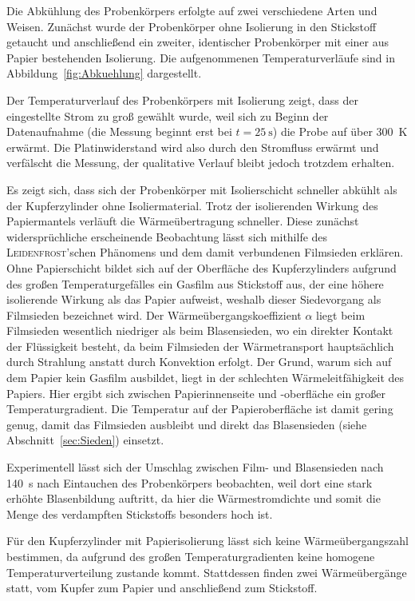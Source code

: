 \documentclass[parskip=half, a4paper,twoside,final]{article}
\begin{document}
Die Abkühlung des Probenkörpers erfolgte auf zwei verschiedene Arten und Weisen. Zunächst wurde der Probenkörper ohne Isolierung in den Stickstoff getaucht und anschließend ein zweiter, identischer Probenkörper mit einer aus Papier bestehenden Isolierung. Die aufgenommenen Temperaturverläufe sind in Abbildung~\ref{fig:Abkuehlung} dargestellt.



Der Temperaturverlauf des Probenkörpers mit Isolierung zeigt, dass der eingestellte Strom zu groß gewählt wurde, weil sich zu Beginn der Datenaufnahme (die Messung beginnt erst bei $t= \SI{25}{\second}$) die Probe auf über \SI{300}{\kelvin} erwärmt. Die Platinwiderstand wird also durch den Stromfluss erwärmt und verfälscht die Messung, der qualitative Verlauf bleibt jedoch trotzdem erhalten.

Es zeigt sich, dass sich der Probenkörper mit Isolierschicht schneller abkühlt als der Kupferzylinder ohne Isoliermaterial. Trotz der isolierenden Wirkung des Papiermantels verläuft die Wärmeübertragung schneller. Diese zunächst widersprüchliche erscheinende Beobachtung lässt sich mithilfe des \textsc{Leidenfrost}'schen Phänomens und dem damit verbundenen Filmsieden erklären. Ohne Papierschicht bildet sich auf der Oberfläche des Kupferzylinders aufgrund des großen Temperaturgefälles ein Gasfilm aus Stickstoff aus, der eine höhere isolierende Wirkung als das Papier aufweist, weshalb dieser Siedevorgang als Filmsieden bezeichnet wird. Der Wärmeübergangskoeffizient $\alpha$ liegt beim Filmsieden wesentlich niedriger als beim Blasensieden, wo ein direkter Kontakt der Flüssigkeit besteht, da beim Filmsieden der Wärmetransport hauptsächlich durch Strahlung anstatt durch Konvektion erfolgt. Der Grund, warum sich auf dem Papier kein Gasfilm ausbildet, liegt in der schlechten Wärmeleitfähigkeit des Papiers. Hier ergibt sich zwischen Papierinnenseite und -oberfläche ein großer Temperaturgradient. Die Temperatur auf der Papieroberfläche ist damit gering genug, damit das Filmsieden ausbleibt und direkt das Blasensieden (siehe Abschnitt~\ref{sec:Sieden}) einsetzt.

Experimentell lässt sich der Umschlag zwischen Film- und Blasensieden nach \SI{140}{\second} nach Eintauchen des Probenkörpers beobachten, weil dort eine stark erhöhte Blasenbildung auftritt, da hier die Wärmestromdichte und somit die Menge des verdampften Stickstoffs besonders hoch ist.

Für den Kupferzylinder mit Papierisolierung lässt sich keine Wärmeübergangszahl bestimmen, da aufgrund des großen Temperaturgradienten keine homogene Temperaturverteilung zustande kommt. Stattdessen finden zwei Wärmeübergänge statt, vom Kupfer zum Papier und anschließend zum Stickstoff.
\end{document}
